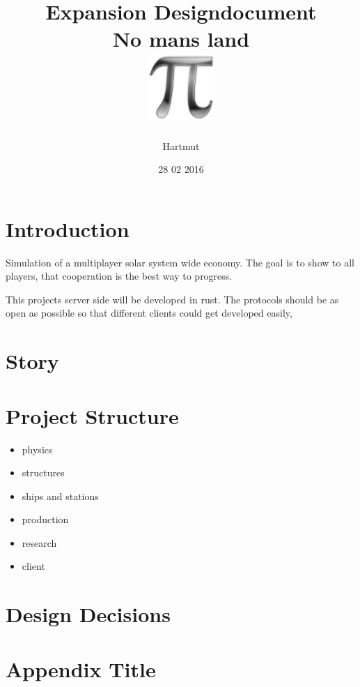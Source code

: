 \documentclass[a4paper,10pt]{book}
\title{
	{Expansion Designdocument}\\
	{\large No mans land}\\
	{\includegraphics{pi-black.png}}
}
\author{Hartmut}
\date{28 02 2016}
\begin{document}
\maketitle

\tableofcontents
\chapter{Introduction}
Simulation of a multiplayer solar system wide economy.
The goal is to show to all players, that cooperation is the best way to progress.

This projects server side will be developed in rust. The protocols should be as open as possible so that different clients could get developed easily,

\chapter{Story}


\chapter{Project Structure}
\begin{itemize}
 \item physics
 \item structures
 \item ships and stations
 \item production
 \item research
 \item client
\end{itemize}


\chapter{Design Decisions}


\appendix
\chapter{Appendix Title}

\end{document}
